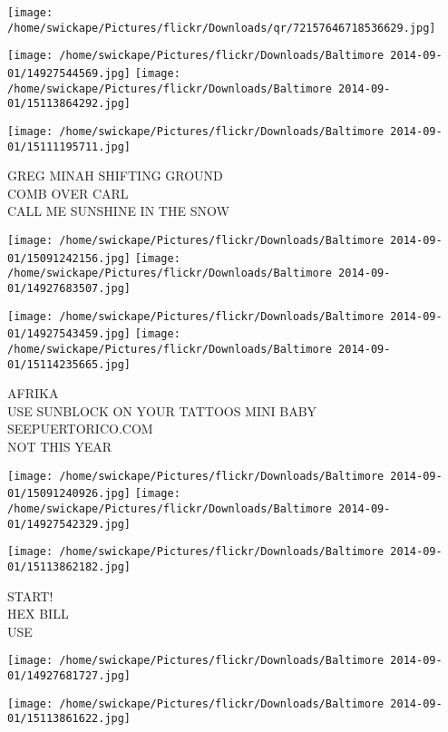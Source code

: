 \documentclass[10pt,letterpaper]{article}
\begin{document}
\texttt{[image: /home/swickape/Pictures/flickr/Downloads/qr/72157646718536629.jpg]}
\pagebreak

\texttt{[image: /home/swickape/Pictures/flickr/Downloads/Baltimore 2014-09-01/14927544569.jpg]}
\texttt{[image: /home/swickape/Pictures/flickr/Downloads/Baltimore 2014-09-01/15113864292.jpg]}

\vspace{0.25in}
\texttt{[image: /home/swickape/Pictures/flickr/Downloads/Baltimore 2014-09-01/15111195711.jpg]}

GREG MINAH SHIFTING GROUND\\
COMB OVER CARL\\
CALL ME SUNSHINE IN THE SNOW
\pagebreak

\texttt{[image: /home/swickape/Pictures/flickr/Downloads/Baltimore 2014-09-01/15091242156.jpg]}
\texttt{[image: /home/swickape/Pictures/flickr/Downloads/Baltimore 2014-09-01/14927683507.jpg]}

\texttt{[image: /home/swickape/Pictures/flickr/Downloads/Baltimore 2014-09-01/14927543459.jpg]}
\texttt{[image: /home/swickape/Pictures/flickr/Downloads/Baltimore 2014-09-01/15114235665.jpg]}

AFRIKA\\
USE SUNBLOCK ON YOUR TATTOOS MINI BABY\\
SEEPUERTORICO.COM\\
NOT THIS YEAR
\pagebreak

\texttt{[image: /home/swickape/Pictures/flickr/Downloads/Baltimore 2014-09-01/15091240926.jpg]}
\texttt{[image: /home/swickape/Pictures/flickr/Downloads/Baltimore 2014-09-01/14927542329.jpg]}

\vspace{0.25in}
\texttt{[image: /home/swickape/Pictures/flickr/Downloads/Baltimore 2014-09-01/15113862182.jpg]}

START!\\
HEX BILL\\
USE
\pagebreak

\texttt{[image: /home/swickape/Pictures/flickr/Downloads/Baltimore 2014-09-01/14927681727.jpg]}

\vspace{0.25in}
\texttt{[image: /home/swickape/Pictures/flickr/Downloads/Baltimore 2014-09-01/15113861622.jpg]}
\end{document}
